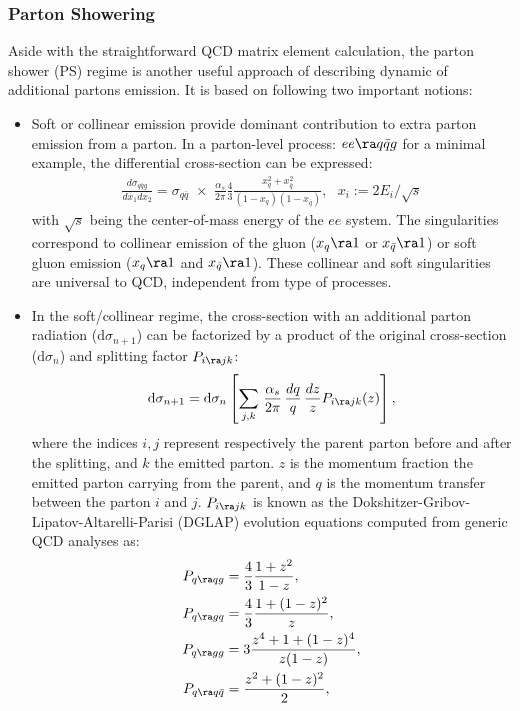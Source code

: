 \subsubsection{Parton Showering}
Aside with the straightforward  QCD matrix element calculation,
the parton shower (PS) regime is another useful approach of describing dynamic of additional partons emission.
It is based on following two important notions:

\begin{itemize}
\item Soft or collinear emission provide dominant contribution to extra parton emission from a parton.
In a parton-level process: $ee \ra q\bar{q} g$ for a minimal example, the differential cross-section can be expressed:
\begin{align}
\frac{d\sigma_{q\bar{q}g}}{dx_1 dx_2} = \sigma_{q\bar{q}} \,\, \times \,\, \frac{\alpha_s}{2\pi} \frac{4}{3} \frac{x_q^2+x_{\bar{q}}^2}{(1-x_q)(1-x_{\bar{q}})}, \,\,\,\, x_i := 2E_i/\sqrt{s}
\end{align}
with $\sqrt{s}$ being the center-of-mass energy of the $ee$ system.
The singularities correspond to collinear emission of the gluon ($x_q \ra 1$ or $x_{\bar{q}} \ra 1$) or soft gluon emission ($x_q \ra 1$ and $x_{\bar{q}} \ra 1$).
These collinear and soft singularities are universal to QCD, independent from type of processes. \\

\item In the soft/collinear regime, the cross-section with an additional parton radiation ($\mathrm{d}\sigma_{n+1}$) can be factorized by a product of the original cross-section ($\mathrm{d}\sigma_{n}$) and splitting factor $P_{i \ra j k}$:
\begin{align}
\mathrm{d}\sigma_{n+1} = \mathrm{d}\sigma_n \left[ \sum_{j,k} \,  \frac{\alpha_s}{2\pi} \, \frac{dq}{q} \, \frac{dz}{z} P_{i \ra j k} (z) \right],
\end{align}
where the indices $i,j$ represent respectively the parent parton before and after the splitting, and $k$ the emitted parton. 
$z$ is the momentum fraction the emitted parton carrying from the parent, and $q$ is the momentum transfer between the parton $i$ and $j$. $P_{i \ra j k}$ is known as the Dokshitzer-Gribov-Lipatov-Altarelli-Parisi (DGLAP) evolution equations \cite{D_DEGLAP}\cite{L_DEGLAP}\cite{AP_DEGLAP} computed from generic QCD analyses as:
\begin{align}
P_{q \ra qg} & = \frac{4}{3} \frac{1+z^2}{1-z}, \\
P_{q \ra gq} & = \frac{4}{3} \frac{1+(1-z)^2}{z}, \\
P_{q \ra gg} & = 3 \frac{z^4+1+(1-z)^4}{z(1-z)}, \\
P_{q \ra q\bar{q}} & = \frac{z^2+(1-z)^2}{2},
\end{align}
\end{itemize}

